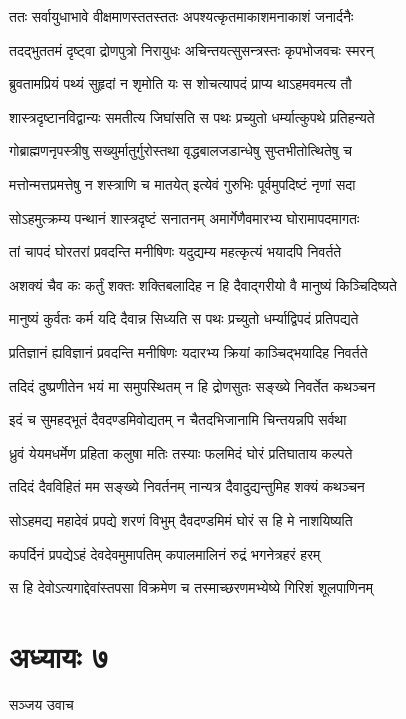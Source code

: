 \twolineshloka
{ततः सर्वायुधाभावे वीक्षमाणस्ततस्ततः}
{अपश्यत्कृतमाकाशमनाकाशं जनार्दनैः}


\twolineshloka
{तदद्भुततमं दृष्ट्वा द्रोणपुत्रो निरायुधः}
{अचिन्तयत्सुसन्त्रस्तः कृपभोजवचः स्मरन्}


\twolineshloka
{ब्रुवतामप्रियं पथ्यं सुहृदां न शृमोति यः}
{स शोचत्यापदं प्राप्य थाऽहमवमत्य तौ}


\twolineshloka
{शास्त्रदृष्टानविद्वान्यः समतीत्य जिघांसति}
{स पथः प्रच्युतो धर्म्यात्कुपथे प्रतिहन्यते}


\twolineshloka
{गोब्राह्मणनृपस्त्रीषु सख्युर्मातुर्गुरोस्तथा}
{वृद्धबालजडान्धेषु सुप्तभीतोत्थितेषु च}


\twolineshloka
{मत्तोन्मत्तप्रमत्तेषु न शस्त्राणि च मातयेत्}
{इत्येवं गुरुभिः पूर्वमुपदिष्टं नृणां सदा}


\twolineshloka
{सोऽहमुत्क्रम्य पन्थानं शास्त्रदृष्टं सनातनम्}
{अमार्गेणैवमारभ्य घोरामापदमागतः}


\twolineshloka
{तां चापदं घोरतरां प्रवदन्ति मनीषिणः}
{यदुद्यम्य महत्कृत्यं भयादपि निवर्तते}


\twolineshloka
{अशक्यं चैव कः कर्तुं शक्तः शक्तिबलादिह}
{न हि दैवाद्गरीयो वै मानुष्यं किञ्चिदिष्यते}


\twolineshloka
{मानुष्यं कुर्वतः कर्म यदि दैवान्न सिध्यति}
{स पथः प्रच्युतो धर्म्याद्विपदं प्रतिपद्यते}


\twolineshloka
{प्रतिज्ञानं ह्यविज्ञानं प्रवदन्ति मनीषिणः}
{यदारभ्य क्रियां काञ्चिद्भयादिह निवर्तते}


\twolineshloka
{तदिदं दुष्प्रणीतेन भयं मा समुपस्थितम्}
{न हि द्रोणसुतः सङ्ख्ये निवर्तेत कथञ्चन}


\twolineshloka
{इदं च सुमहद्भूतं दैवदण्डमिवोद्यतम्}
{न चैतदभिजानामि चिन्तयन्नपि सर्वथा}


\twolineshloka
{ध्रुवं येयमधर्मेण प्रहिता कलुषा मतिः}
{तस्याः फलमिदं घोरं प्रतिघाताय कल्पते}


\twolineshloka
{तदिदं दैवविहितं मम सङ्ख्ये निवर्तनम्}
{नान्यत्र दैवादुद्यन्तुमिह शक्यं कथञ्चन}


\twolineshloka
{सोऽहमद्य महादेवं प्रपद्ये शरणं विभुम्}
{दैवदण्डमिमं घोरं स हि मे नाशयिष्यति}


\twolineshloka
{कपर्दिनं प्रपद्येऽहं देवदेवमुमापतिम्}
{कपालमालिनं रुद्रं भगनेत्रहरं हरम्}


\twolineshloka
{स हि देवोऽत्यगाद्देवांस्तपसा विक्रमेण च}
{तस्माच्छरणमभ्येष्ये गिरिशं शूलपाणिनम्}


\chapter{अध्यायः ७}
\twolineshloka
{सञ्जय उवाच}
{}


